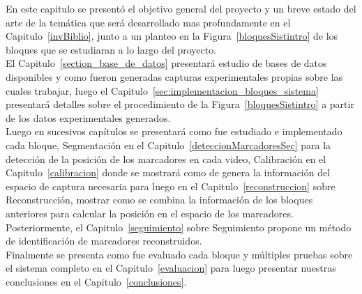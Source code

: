 En este capitulo se presentó el objetivo general del proyecto y un breve estado del arte de la temática que será desarrollado mas profundamente en el Capitulo~\ref{invBiblio}, junto a un planteo en la Figura~\ref{bloquesSistintro} de los bloques que se estudiaran a lo largo del proyecto. 
\\

El Capitulo~\ref{section_base_de_datos} presentará estudio de bases de datos disponibles y como fueron generadas capturas experimentales propias sobre las cuales trabajar, luego el Capitulo~\ref{sec:implementacion_bloques_sistema} presentará detalles sobre el procedimiento de la Figura~\ref{bloquesSistintro} a partir de los datos experimentales generados. 
\\

Luego en sucesivos capítulos se presentará como fue estudiado e implementado cada bloque, Segmentación en el Capitulo~\ref{deteccionMarcadoresSec} para la detección de la posición de los marcadores en cada video, Calibración en el Capitulo~\ref{calibracion} donde se mostrará como de genera la información del espacio de captura necesaria para luego en el Capitulo~\ref{reconstruccion} sobre Reconstrucción, mostrar como se combina la información de los bloques anteriores para calcular la posición en el espacio de los marcadores. 
\\

Posteriormente, el Capitulo~\ref{seguimiento} sobre Seguimiento propone un método de identificación de marcadores reconstruidos. 
\\

Finalmente se presenta como fue evaluado cada bloque y múltiples pruebas sobre el sistema completo en el Capitulo~\ref{evaluacion} para luego presentar nuestras conclusiones en el Capitulo~\ref{conclusiones}.


 
  


